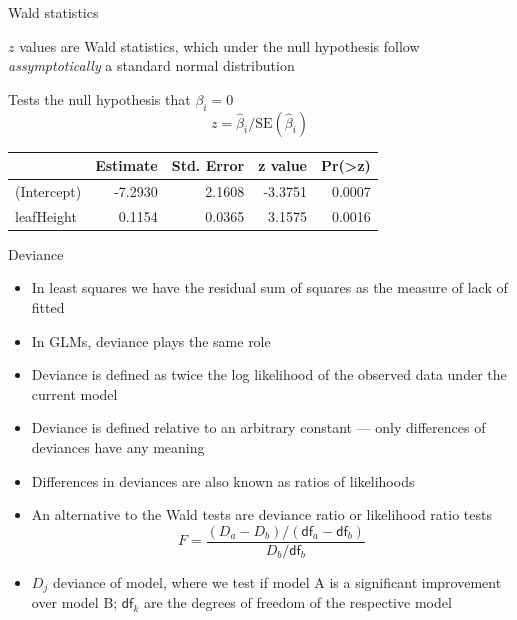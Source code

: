 \documentclass[10pt,ignorenonframetext,compress, aspectratio=169]{beamer}
\providecommand{\tightlist}{%
  \setlength{\itemsep}{0pt}\setlength{\parskip}{0pt}}
\begin{document}
\begin{frame}{Wald statistics}

\(z\) values are Wald statistics, which under the null hypothesis follow
\emph{assymptotically} a standard normal distribution

Tests the null hypothesis that \(\beta_i = 0\)
\[z = \hat{\beta}_i / \mathrm{SE}(\hat{\beta}_i)\]

\begin{longtable}[]{@{}lrrrr@{}}
\toprule
& Estimate & Std. Error & z value &
Pr(\textgreater{}\textbar{}z\textbar{})\tabularnewline
\midrule
\endhead
(Intercept) & -7.2930 & 2.1608 & -3.3751 & 0.0007\tabularnewline
leafHeight & 0.1154 & 0.0365 & 3.1575 & 0.0016\tabularnewline
\bottomrule
\end{longtable}

\end{frame}

\begin{frame}{Deviance}

\begin{itemize}
\tightlist
\item
  In least squares we have the residual sum of squares as the measure of
  lack of fitted
\item
  In GLMs, \alert{deviance} plays the same role
\item
  Deviance is defined as twice the log likelihood of the observed data
  under the current model
\item
  Deviance is defined relative to an arbitrary constant --- only
  \alert{differences} of deviances have any meaning
\item
  Differences in deviances are also known as ratios of likelihoods
\item
  An alternative to the Wald tests are deviance ratio or likelihood
  ratio tests
  \[F = \frac{(D_a - D_b) / (\mathsf{df}_a - \mathsf{df}_b)}{D_b / \mathsf{df}_b}\]
\item
  \(D_j\) deviance of model, where we test if model A is a significant
  improvement over model B; \(\mathsf{df}_k\) are the degrees of freedom
  of the respective model
\end{itemize}

\end{frame}
\end{document}
